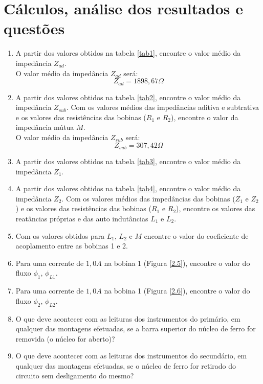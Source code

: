 \documentclass[a4paper,12pt,oneside,openany,table,xcdraw]{article}
\begin{document}
\section{Cálculos, análise dos resultados e questões} %

\begin{enumerate}[1 - ]
\item A partir dos valores obtidos na tabela \ref{tab1}, encontre o valor médio da impedância $Z_{ad}$.\\
O valor médio da impedância $Z_{ad}$ será:
$$Z_{ad}=1898,67\Omega$$

\item A partir dos valores obtidos na tabela \ref{tab2}, encontre o valor médio da impedância $Z_{sub}$.
Com os valores médios das impedâncias aditiva e subtrativa e os valores das resistências das
bobinas ($R_1$ e $R_2$), encontre o valor da impedância mútua $M$. \\
O valor médio da impedância $Z_{sub}$ será:
$$Z_{sub}=307,42\Omega$$



\item A partir dos valores obtidos na tabela \ref{tab3}, encontre o valor médio da impedância $Z_1$.\\
\item A partir dos valores obtidos na tabela \ref{tab4}, encontre o valor médio da impedância $Z_2$.
Com os valores médios das impedâncias das bobinas ($Z_1$ e $Z_2$) e os valores das resistências
das bobinas ($R_1$ e $R_2$), encontre os valores das reatâncias próprias e das auto indutâncias $L_1$
e $L_2$.\\


\item Com os valores obtidos para $L_1$, $L_2$ e $M$ encontre o valor do coeficiente de acoplamento
entre as bobinas 1 e 2. \\

\item Para uma corrente de $1,0 A$ na bobina 1 (Figura \ref{2.5}), encontre o valor do fluxo $\phi_1$, $\phi_{L1}$. \\
\item Para uma corrente de $1,0 A$ na bobina 1 (Figura \ref{2.6}), encontre o valor do fluxo $\phi_2$, $\phi_{L2}$. \\

\item O que deve acontecer com as leituras dos instrumentos do primário, em qualquer das
montagens efetuadas, se a barra superior do núcleo de ferro for removida (o núcleo for
aberto)? \\

\item O que deve acontecer com as leituras dos instrumentos do secundário, em qualquer das
montagens efetuadas, se o núcleo de ferro for retirado do circuito sem desligamento do
mesmo? \\


\end{enumerate}
\end{document}
